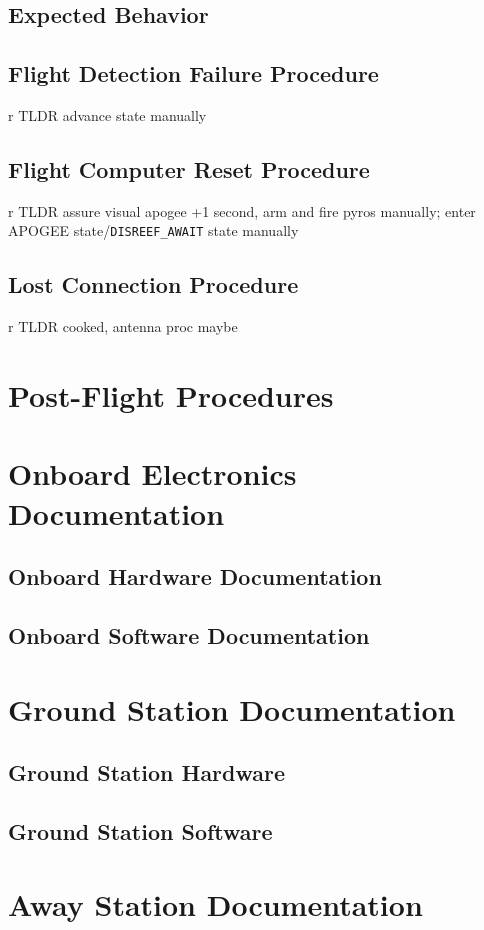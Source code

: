 \documentclass{amsdtx}
\begin{document}
\subsection{Expected Behavior}
\subsection{Flight Detection Failure Procedure}
{\color r TLDR advance state manually}
\subsection{Flight Computer Reset Procedure}
{\color r TLDR assure visual apogee +1 second, arm and fire pyros manually; enter APOGEE state/\verb|DISREEF_AWAIT| state manually}
\subsection{Lost Connection Procedure}
{\color r TLDR cooked, antenna proc maybe}
\newpage\section{Post-Flight Procedures}
\newpage\section{Onboard Electronics Documentation}
\subsection{Onboard Hardware Documentation}
\subsection{Onboard Software Documentation}
\newpage\section{Ground Station Documentation}
\subsection{Ground Station Hardware}
\subsection{Ground Station Software}
\newpage\section{Away Station Documentation}
\end{document}
